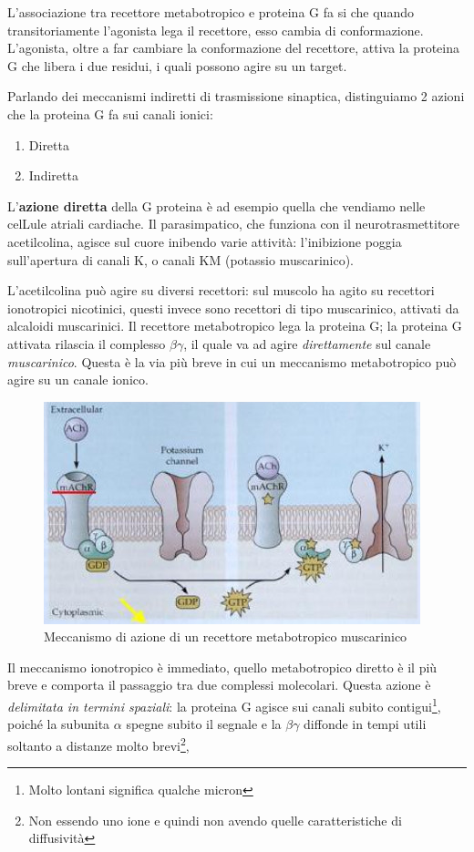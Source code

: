 \documentclass[a4paper,12pt]{article}
\begin{document}
L'associazione tra recettore metabotropico e proteina G fa si che quando transitoriamente l'agonista lega il recettore, esso cambia di conformazione. L'agonista, oltre a far cambiare la conformazione del recettore, attiva la proteina G che libera i due residui, i quali possono agire su un target.

Parlando dei meccanismi indiretti di trasmissione sinaptica, distinguiamo 2 azioni che la proteina G fa sui canali ionici:
\begin{enumerate}
\item{Diretta}
\item{Indiretta}
\end{enumerate}

L'\textbf{azione diretta} della G proteina è ad esempio quella che vendiamo nelle celLule atriali cardiache. Il parasimpatico, che funziona con il neurotrasmettitore acetilcolina, agisce sul cuore inibendo varie attività: l'inibizione poggia sull'apertura di canali K, o canali KM (potassio muscarinico).

L'acetilcolina può agire su diversi recettori: sul muscolo ha agito su recettori ionotropici nicotinici, questi invece sono recettori di tipo muscarinico, attivati da alcaloidi muscarinici. Il recettore metabotropico lega la proteina G; la proteina G attivata rilascia il complesso $\beta \gamma$, il quale va ad agire \emph{direttamente} sul canale \emph{muscarinico}. Questa è la via più breve in cui un meccanismo metabotropico può agire su un canale ionico.

\begin{figure}[H]
\centering
\includegraphics[scale=0.4]{immagine/muscarinico.jpg}
\caption{Meccanismo di azione di un recettore metabotropico muscarinico}
\end{figure} 

Il meccanismo ionotropico è immediato, quello metabotropico diretto è il più breve e comporta il passaggio tra due complessi molecolari. Questa azione è \emph{delimitata in termini spaziali}: la proteina G agisce sui canali subito contigui\footnote{Molto lontani significa qualche micron}, poiché la subunita $\alpha$ spegne subito il segnale e la $\beta \gamma$ diffonde in tempi utili soltanto a distanze molto brevi\footnote{Non essendo uno ione e quindi non avendo quelle caratteristiche di diffusività},
\end{document}
